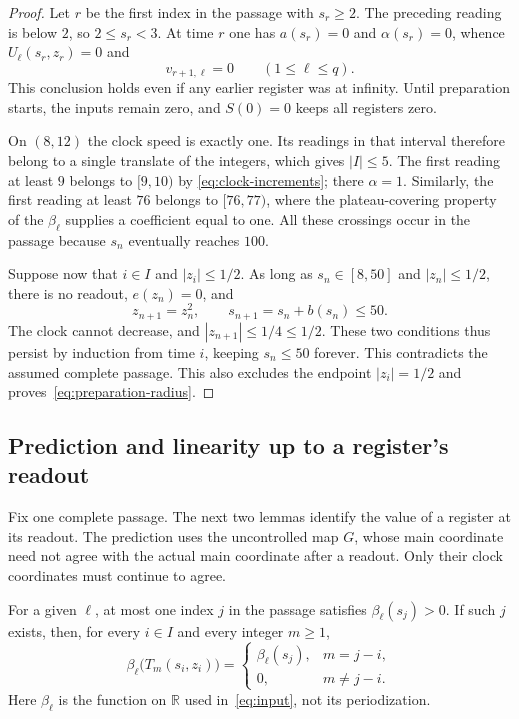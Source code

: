 \begin{proof}
Let $r$ be the first index in the passage with $s_r\ge2$.  The preceding
reading is below $2$, so $2\le s_r<3$.  At time $r$ one has $a(s_r)=0$ and
$\alpha(s_r)=0$, whence $U_\ell(s_r,z_r)=0$ and
\[
 v_{r+1,\ell}=0\qquad(1\le \ell\le q).
\]
This conclusion holds even if any earlier register was at infinity.
Until preparation starts, the inputs remain zero, and $S(0)=0$ keeps all
registers zero.

On $(8,12)$ the clock speed is exactly one.  Its readings in that interval
therefore belong to a single translate of the integers, which gives
$|I|\le5$.  The first reading at least $9$ belongs to $[9,10)$ by
\eqref{eq:clock-increments}; there $\alpha=1$.  Similarly, the first reading
at least $76$ belongs to $[76,77)$, where the plateau-covering property of
the $\beta_\ell$ supplies a coefficient equal to one.  All these crossings
occur in the passage because $s_n$ eventually reaches $100$.

Suppose now that $i\in I$ and $|z_i|\le1/2$.  As long as
$s_n\in[8,50]$ and $|z_n|\le1/2$, there is no readout, $e(z_n)=0$, and
\[
 z_{n+1}=z_n^2,\qquad s_{n+1}=s_n+b(s_n)\le50.
\]
The clock cannot decrease, and $|z_{n+1}|\le1/4\le1/2$.  These two
conditions thus persist by induction from time $i$, keeping $s_n\le50$
forever.  This contradicts the assumed complete passage.  This also
excludes the endpoint $|z_i|=1/2$ and proves~\eqref{eq:preparation-radius}.
\end{proof}

\subsection{Prediction and linearity up to a register's readout}

Fix one complete passage.  The next two lemmas identify the value of a
register at its readout.  The prediction uses the uncontrolled map $G$,
whose main coordinate need not agree with the actual main coordinate after
a readout.  Only their clock coordinates must continue to agree.

\begin{lemma}\label{lem:clock-prediction}
For a given $\ell$, at most one index $j$ in the passage satisfies
$\beta_\ell(s_j)>0$.  If such $j$ exists, then, for every $i\in I$ and every
integer $m\ge1$,
\begin{equation}\label{eq:prediction-single-hit}
 \beta_\ell\bigl(T_m(s_i,z_i)\bigr)=
 \begin{cases}
  \beta_\ell(s_j),&m=j-i,\\
  0,&m\ne j-i.
 \end{cases}
\end{equation}
Here $\beta_\ell$ is the function on $\mathbb R$ used in~\eqref{eq:input},
not its periodization.
\end{lemma}

